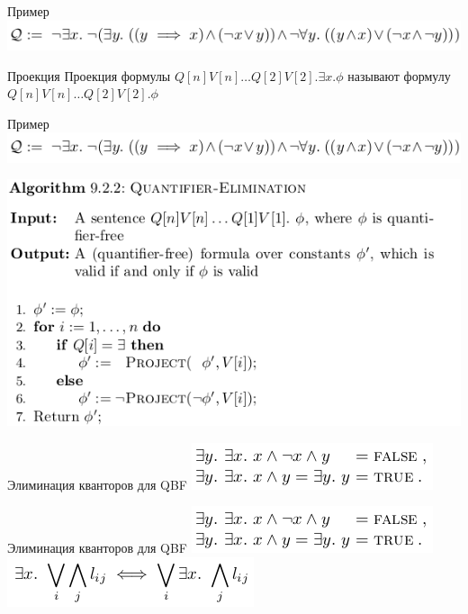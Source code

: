 \documentclass{beamer}
\begin{document}
\begin{frame}{Пример}
\includegraphics[scale=0.5]{prenex_example.png}\newline
\end{frame}

\begin{frame}{Проекция}
Проекция формулы $Q[n]V[n]\dots Q[2]V[2].\exists x.\phi$\newline
называют формулу $Q[n]V[n]\dots Q[2]V[2].\phi$
\end{frame}

\begin{frame}{Пример}
\includegraphics[scale=0.5]{prenex_example.png}\newline
\end{frame}

\begin{frame}
\includegraphics[scale=0.5]{quantifier-elimination.png}\newline
\end{frame}

\begin{frame}{Элиминация кванторов для QBF}
\includegraphics[scale=0.5]{elem_qbf1.png}\newline
\end{frame}

\begin{frame}{Элиминация кванторов для QBF}
\includegraphics[scale=0.5]{elem_qbf1.png}\newline
\includegraphics[scale=0.5]{elem_qbf2.png}\newline
\end{frame}
\end{document}
